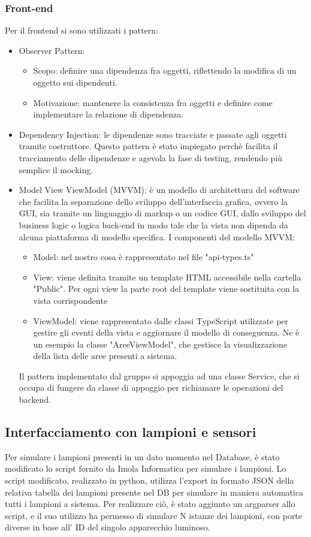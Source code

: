 \documentclass[12pt]{article}
\begin{document}
\subsubsection{Front-end}
Per il frontend si sono utilizzati i pattern:
\begin{itemize}
	\item Observer Pattern:
	\begin{itemize}
		\item Scopo: definire una dipendenza fra oggetti, riflettendo la modifica di un oggetto sui dipendenti.
		\item Motivazione: mantenere la consistenza fra oggetti e definire come implementare la relazione di dipendenza.
	\end{itemize}
	\item Dependency Injection: le dipendenze sono tracciate e passate agli oggetti tramite costruttore.
	 Questo pattern è stato impiegato perchè facilita il tracciamento delle dipendenze e agevola la fase di testing, rendendo più semplice il mocking.
	\item Model View ViewModel (MVVM): è un modello di architettura del software che facilita la separazione dello sviluppo dell'interfaccia grafica, ovvero la GUI,
sia tramite un linguaggio di markup o un codice GUI, dallo sviluppo del business logic o logica back-end in modo tale che la vista non dipenda da alcuna piattaforma di modello specifica.
I componenti del modello MVVM:	
	\begin{itemize}
		\item Model: nel nostro cosa è rappresentato nel file "api-types.ts"
		\item View: viene definita tramite un template HTML accessibile nella cartella "Public". Per ogni view la parte root del template viene sostituita con la vista corrispondente
		\item ViewModel: viene rappresentato dalle classi TypeScript utilizzate per gestire gli eventi della vista e aggiornare il modello di conseguenza. Ne è un esempio la classe "AreeViewModel", che gestisce la visualizzazione della lista delle aree presenti a sistema.
	\end{itemize}
Il pattern implementato dal gruppo si appoggia ad una classe Service, che si occupa di fungere da classe di appoggio per richiamare le operazioni del backend.
\end{itemize}
\subsection{Interfacciamento con lampioni e sensori}
Per simulare i lampioni presenti in un dato momento nel Database, è stato modificato lo script fornito da Imola Informatica per simulare i lampioni.
Lo script modificato, realizzato in python, utilizza l'export in formato JSON della relativa tabella dei lampioni presente nel DB per simulare in maniera automatica tutti i lampioni a sistema.
Per realizzare ciò, è stato aggiunto un argparser allo script, e il suo utilizzo ha permesso di simulare N istanze dei lampioni, con porte diverse in base all' ID del singolo apparecchio luminoso.
\end{document}
